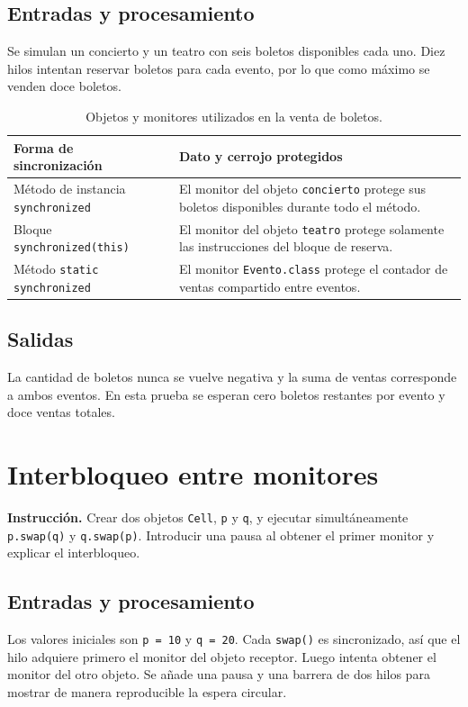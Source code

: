 \documentclass[12pt,oneside]{book}
\begin{document}
\section{Entradas y procesamiento}
Se simulan un concierto y un teatro con seis boletos disponibles cada uno. Diez hilos intentan reservar boletos para cada evento, por lo que como máximo se venden doce boletos.

\begin{table}[H]\centering
\caption{Objetos y monitores utilizados en la venta de boletos.}
\begin{tabularx}{\textwidth}{P{4.3cm} L}
\toprule
\textbf{Forma de sincronización} & \textbf{Dato y cerrojo protegidos}\\\midrule
Método de instancia \texttt{synchronized} & El monitor del objeto \texttt{concierto} protege sus boletos disponibles durante todo el método.\\
Bloque \texttt{synchronized(this)} & El monitor del objeto \texttt{teatro} protege solamente las instrucciones del bloque de reserva.\\
Método \texttt{static synchronized} & El monitor \texttt{Evento.class} protege el contador de ventas compartido entre eventos.\\\bottomrule
\end{tabularx}
\end{table}

\section{Salidas}
La cantidad de boletos nunca se vuelve negativa y la suma de ventas corresponde a ambos eventos. En esta prueba se esperan cero boletos restantes por evento y doce ventas totales.


\chapter{Interbloqueo entre monitores}
\textbf{Instrucción.} Crear dos objetos \texttt{Cell}, \texttt{p} y \texttt{q}, y ejecutar simultáneamente \texttt{p.swap(q)} y \texttt{q.swap(p)}. Introducir una pausa al obtener el primer monitor y explicar el interbloqueo.

\section{Entradas y procesamiento}
Los valores iniciales son \texttt{p = 10} y \texttt{q = 20}. Cada \texttt{swap()} es sincronizado, así que el hilo adquiere primero el monitor del objeto receptor. Luego intenta obtener el monitor del otro objeto. Se añade una pausa y una barrera de dos hilos para mostrar de manera reproducible la espera circular.
\end{document}
